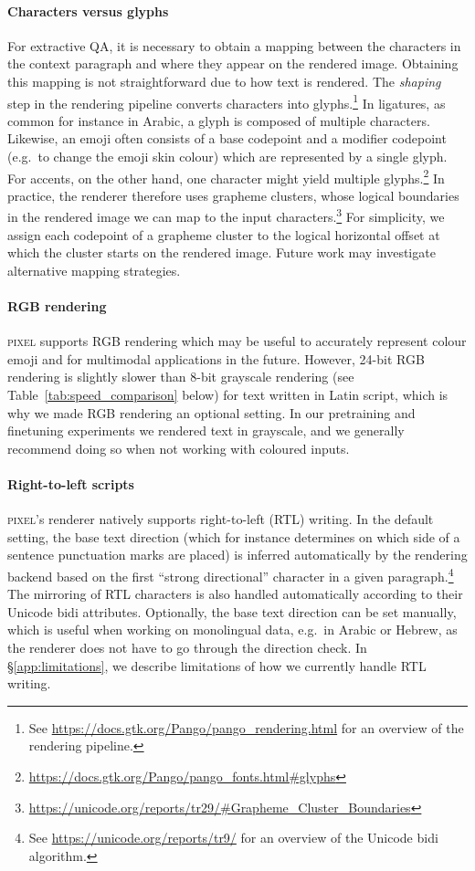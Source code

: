 \documentclass{article}
\newcommand{\model}{\textsc{pixel}\xspace}
\begin{document}
\paragraph{Characters versus glyphs} For extractive QA, it is necessary to obtain a mapping between the characters in the context paragraph and where they appear on the rendered image. Obtaining this mapping is not straightforward due to how text is rendered. The \emph{shaping} step in the rendering pipeline converts characters into glyphs.\footnote{See \url{https://docs.gtk.org/Pango/pango_rendering.html} for an overview of the rendering pipeline.} In ligatures, as common for instance in Arabic, a glyph is composed of multiple characters. Likewise, an emoji often consists of a base codepoint and a modifier codepoint (e.g.\ to change the emoji skin colour) which are represented by a single glyph. For accents, on the other hand, one character might yield multiple glyphs.\footnote{\url{https://docs.gtk.org/Pango/pango_fonts.html\#glyphs}} In practice, the renderer therefore uses grapheme clusters, whose logical boundaries in the rendered image we can map to the input characters.\footnote{\url{https://unicode.org/reports/tr29/\#Grapheme\_Cluster\_Boundaries}} For simplicity, we assign each codepoint of a grapheme cluster to the logical horizontal offset at which the cluster starts on the rendered image. Future work may investigate alternative mapping strategies.

\paragraph{RGB rendering} \model supports RGB rendering which may be useful to accurately represent colour emoji and for multimodal applications in the future. However, 24-bit RGB rendering is slightly slower than 8-bit grayscale rendering (see Table~\ref{tab:speed_comparison} below) for text written in Latin script, which is why we made RGB rendering an optional setting. In our pretraining and finetuning experiments we rendered text in grayscale, and we generally recommend doing so when not working with coloured inputs.

\paragraph{Right-to-left scripts} \model's renderer natively supports right-to-left (RTL) writing. In the default setting, the base text direction (which for instance determines on which side of a sentence punctuation marks are placed) is inferred automatically by the rendering backend based on the first ``strong directional'' character in a given paragraph.\footnote{See \url{https://unicode.org/reports/tr9/} for an overview of the Unicode bidi algorithm.} The mirroring of RTL characters is also handled automatically according to their Unicode bidi attributes.
Optionally, the base text direction can be set manually, which is useful when working on monolingual data, e.g.\ in Arabic or Hebrew, as the renderer does not have to go through the direction check. In \S \ref{app:limitations}, we describe limitations of how we currently handle RTL writing.
\end{document}
